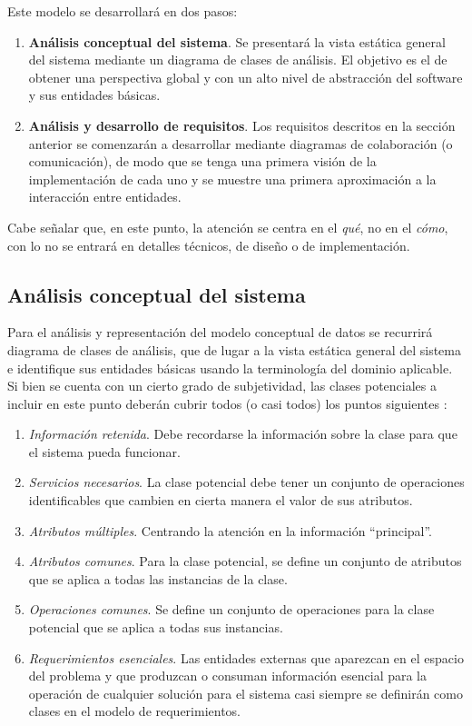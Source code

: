 Este modelo se desarrollará en dos pasos: 

\begin{enumerate}  
	\item \textbf{Análisis conceptual del sistema}. Se presentará la vista estática general del sistema mediante un diagrama de clases de análisis. El objetivo es el de obtener una perspectiva global y con un alto nivel de abstracción del software y sus entidades básicas.
	\item \textbf{Análisis y desarrollo de requisitos}. Los requisitos descritos en la sección anterior se comenzarán a desarrollar mediante diagramas de colaboración (o comunicación), de modo que se tenga una primera visión de la implementación de cada uno y se muestre una primera aproximación a la interacción entre entidades.
\end{enumerate}

Cabe señalar que, en este punto, la atención se centra en el \emph{qué}, no en el \emph{cómo}, con lo no se entrará en detalles técnicos, de diseño o de implementación.

\subsection{Análisis conceptual del sistema}

Para el análisis y representación del modelo conceptual de datos se recurrirá diagrama de clases de análisis, que de lugar a la vista estática general del sistema e identifique sus entidades básicas usando la terminología del dominio aplicable. Si bien se cuenta con un cierto grado de subjetividad, las clases potenciales a incluir en este punto deberán cubrir todos (o casi todos) los puntos siguientes \cite{Coa91}:

\begin{enumerate}  
	\item \textit{Información retenida}. Debe recordarse la información sobre la clase para que el sistema pueda funcionar.
	\item \textit{Servicios necesarios}. La clase potencial debe tener un conjunto de operaciones identificables que cambien en cierta manera el valor de sus atributos.
	\item \textit{Atributos múltiples}. Centrando la atención en la información ``principal''.
	\item \textit{Atributos comunes}. Para la clase potencial, se define un conjunto de atributos que se aplica a todas las instancias de la clase.
	\item \textit{Operaciones comunes}. Se define un conjunto de operaciones para la clase potencial que se aplica a todas sus instancias.
	\item \textit{Requerimientos esenciales}. Las entidades externas que aparezcan en el espacio del problema y que produzcan o consuman información esencial para la operación de cualquier solución para el sistema casi siempre se definirán como clases en el modelo de requerimientos.	
\end{enumerate}

